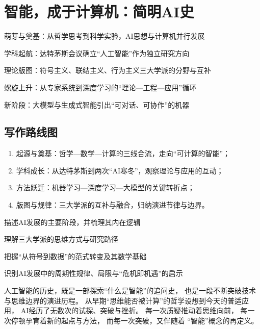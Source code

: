 
\chapter{智能，成于计算机：简明AI史}



\begin{introduction}  
  \item 萌芽与奠基：从哲学思考到科学实验，AI思想与计算机并行发展
  \item 学科起航：达特茅斯会议确立“人工智能”作为独立研究方向
  \item 理论版图：符号主义、联结主义、行为主义三大学派的分野与互补
  \item 螺旋上升：从专家系统到深度学习的“理论—工程—应用”循环
  \item 新阶段：大模型与生成式智能引出“可对话、可协作”的机器
\end{introduction}

\section*{写作路线图}
\begin{enumerate}
  \item 起源与奠基：哲学—数学—计算的三线合流，走向“可计算的智能”；
  \item 学科成长：从达特茅斯到两次“AI寒冬”，观察理论与应用的互动；
  \item 方法跃迁：机器学习—深度学习—大模型的关键转折点；
  \item 版图与规律：三大学派的互补与融合，归纳演进节律与边界。
\end{enumerate}

\begin{introduction}
  \item 描述AI发展的主要阶段，并梳理其内在逻辑
  \item 理解三大学派的思维方式与研究路径
  \item 把握“从符号到数据”的范式转变及其数学基础
  \item 识别AI发展中的周期性规律、局限与“危机即机遇”的启示
\end{introduction}

 

人工智能的历史，既是一部探索“什么是智能”的追问史，
也是一段不断突破技术与思维边界的演进历程。
从早期“思维能否被计算”的哲学设想到今天的普适应用，
AI经历了无数次的试探、突破与挫折。  
每一次质疑推动着思维向前，
每一次停顿孕育着新的起点与方法，
而每一次突破，又伴随着 “智能”概念的再定义。

